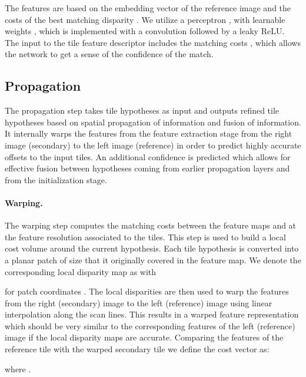 \documentclass[final]{cvpr}
\begin{document}
The features are based on the embedding vector of the reference image  and the costs  of the best matching disparity . We utilize a perceptron , with learnable weights , which is implemented with a  convolution followed by a leaky ReLU. The input to the tile feature descriptor includes the matching costs , which allows the network to get a sense of the confidence of the match.

\subsection{Propagation}
\label{sec:propagation}

The propagation step takes tile hypotheses as input and outputs refined tile hypotheses based on spatial propagation of information and fusion of information. It internally warps the features from the feature extraction stage from the right image (secondary) to the left image (reference) in order to predict highly accurate offsets to the input tiles. An additional confidence is predicted which allows for effective fusion between hypotheses coming from earlier propagation layers and from the initialization stage. 

\paragraph{Warping.}
The warping step computes the matching costs between the feature maps  and  at the feature resolution  associated to the tiles. This step is used to build a local cost volume around the current hypothesis. Each tile hypothesis is converted into a planar patch of size  that it originally covered in the feature map. We denote the corresponding  local disparity map as  with

for patch coordinates . The local disparities are then used to warp the features  from the right (secondary) image to the left (reference) image using linear interpolation along the scan lines. This results in a warped feature representation  which should be very similar to the corresponding features of the left (reference) image  if the local disparity maps  are accurate. Comparing the features of the reference  tile with the warped secondary tile we define the cost vector  as:

where .
\end{document}

